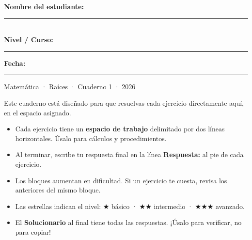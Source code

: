 \documentclass[11pt, letterpaper]{article}
\begin{document}
\vfill

\begin{center}
\begin{tcolorbox}[enhanced, width=0.80\linewidth,
  colback=zenitlightgray, colframe=zenitnavy,
  arc=6pt, left=18pt, right=18pt, top=12pt, bottom=12pt]
\begin{center}
{\bfseries\color{zenitnavy} Nombre del estudiante:}\\[9pt]
\rule{9cm}{0.55pt}\\[8pt]
{\bfseries\color{zenitnavy} Nivel / Curso:}\;\rule{3.2cm}{0.5pt}
\qquad\qquad
{\bfseries\color{zenitnavy} Fecha:}\;\rule{3.2cm}{0.5pt}
\end{center}
\end{tcolorbox}
\end{center}

\vspace{0.5cm}
\begin{center}
{\color{zenitgold} Matemática · Raíces · Cuaderno 1 · 2026}
\end{center}

\clearpage
\thispagestyle{empty}

\begin{tcolorbox}[importantbox, title={¿Cómo usar este cuaderno?}]
Este cuaderno está diseñado para que resuelvas cada ejercicio directamente aquí, en el espacio asignado.

\medskip

\begin{itemize}
  \item Cada ejercicio tiene un \textbf{espacio de trabajo} delimitado por dos líneas horizontales. Úsalo para cálculos y procedimientos.
  \item Al terminar, escribe tu respuesta final en la línea \textbf{Respuesta:} al pie de cada ejercicio.
  \item Los bloques aumentan en dificultad. Si un ejercicio te cuesta, revisa los anteriores del mismo bloque.
  \item Las estrellas indican el nivel: $\bigstar$ básico · $\bigstar\bigstar$ intermedio · $\bigstar\bigstar\bigstar$ avanzado.
  \item El \textbf{Solucionario} al final tiene todas las respuestas. ¡Úsalo para verificar, no para copiar!
\end{itemize}
\end{tcolorbox}
\end{document}
